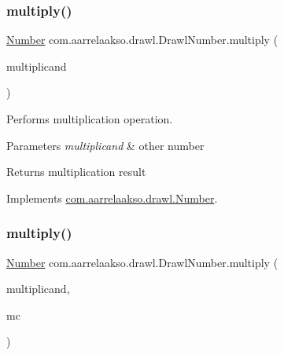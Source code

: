 \subsubsection{\texorpdfstring{multiply()}{multiply()}\hspace{0.1cm}{\footnotesize\ttfamily [1/3]}}
{\footnotesize\ttfamily \hyperlink{interfacecom_1_1aarrelaakso_1_1drawl_1_1_number}{Number} com.\+aarrelaakso.\+drawl.\+Drawl\+Number.\+multiply (\begin{DoxyParamCaption}\item[{@Not\+Null final \hyperlink{interfacecom_1_1aarrelaakso_1_1drawl_1_1_number}{Number}}]{multiplicand }\end{DoxyParamCaption})}



Performs multiplication operation. 


\begin{DoxyParams}{Parameters}
{\em multiplicand} & other number \\
\hline
\end{DoxyParams}
\begin{DoxyReturn}{Returns}
multiplication result 
\end{DoxyReturn}


Implements \hyperlink{interfacecom_1_1aarrelaakso_1_1drawl_1_1_number_a4748fed26ef4d662d7a277dc2687acca}{com.\+aarrelaakso.\+drawl.\+Number}.

\mbox{\label{classcom_1_1aarrelaakso_1_1drawl_1_1_drawl_number_a11144527a91f9a750b9042a3ac84f631}} 
\subsubsection{\texorpdfstring{multiply()}{multiply()}\hspace{0.1cm}{\footnotesize\ttfamily [2/3]}}
{\footnotesize\ttfamily \hyperlink{interfacecom_1_1aarrelaakso_1_1drawl_1_1_number}{Number} com.\+aarrelaakso.\+drawl.\+Drawl\+Number.\+multiply (\begin{DoxyParamCaption}\item[{@Not\+Null final \hyperlink{interfacecom_1_1aarrelaakso_1_1drawl_1_1_number}{Number}}]{multiplicand,  }\item[{final Math\+Context}]{mc }\end{DoxyParamCaption})}



